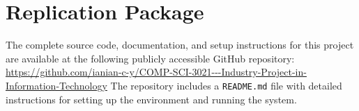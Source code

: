 \documentclass[12pt,a4paper]{article}
\begin{document}
    \section{Replication Package}
    The complete source code, documentation, and setup instructions for this project are available at the following publicly accessible GitHub repository:
    \url{https://github.com/ianian-c-y/COMP-SCI-3021---Industry-Project-in-Information-Technology}
    The repository includes a \texttt{README.md} file with detailed instructions for setting up the environment and running the system.
    \clearpage %
    \printbibliography[title={References}]
\end{document}

